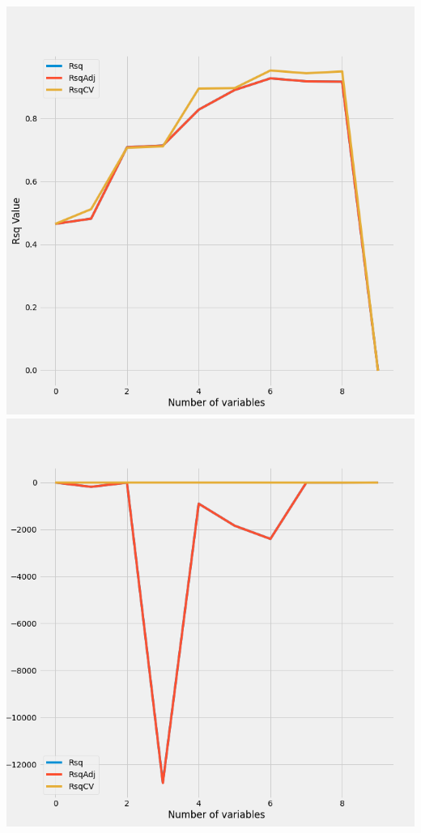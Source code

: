 \documentclass{article}
\begin{document}
	\includegraphics[scale = 0.2]{../plots/python/AutoForward4L.png} 
	\includegraphics[scale = 0.2]{../plots/python/Backward4L.png}
\end{document}
